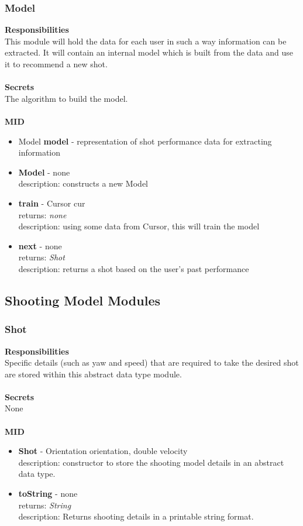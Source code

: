 \documentclass[11pt]{article}
\begin{document}
\subsubsection*{Model}
\textbf{Responsibilities} \\
This module will hold the data for each user in such a way information can be extracted. It will contain an internal model which is built from the data and use it to recommend a new shot. \\ \\
\textbf{Secrets} \\
The algorithm to build the model. \\ \\
\textbf{MID}
\begin{itemize}
\item Model \textbf{model} - representation of shot performance data for extracting information
\item \textbf{Model} - none \\ description: constructs a new Model
\item \textbf{train} - Cursor cur \\ returns: \textit{none} \\ description: using some data from Cursor, this will train the model
\item \textbf{next} - none \\ returns: \textit{Shot} \\ description: returns a shot based on the user's past performance
\end{itemize}

\subsection{Shooting Model Modules}
\subsubsection*{Shot}
\textbf{Responsibilities} \\
Specific details (such as yaw and speed) that are required to take the desired shot are stored within this abstract data type module. \\ \\
\textbf{Secrets} \\ 
None \\  \\
\textbf{MID} 
\begin{itemize}
\item \textbf{Shot} - Orientation orientation, double velocity \\ description: constructor to store the shooting model details in an abstract data type.
\item \textbf{toString} - none \\ returns: \textit{String} \\ description: Returns shooting details in a printable string format.
\end{itemize}
\end{document}
